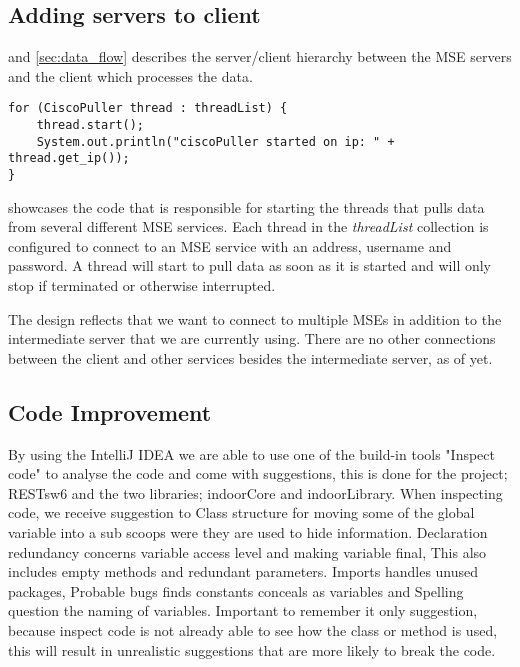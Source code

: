 \subsection*{Adding servers to client}
 and \cref{sec:data_flow} describes the server/client hierarchy between the MSE servers and the client which processes the data. 
\begin{lstlisting}[caption={Starting multiple threads to pull data from multiple MSE servers}, label={lst:cisco_puller}, language=inc_Java]
for (CiscoPuller thread : threadList) {
    thread.start();
    System.out.println("ciscoPuller started on ip: " + thread.get_ip());
}
\end{lstlisting}
 showcases the code that is responsible for starting the threads that pulls data from several different MSE services. Each thread in the \textit{threadList} collection is configured to connect to an MSE service with an address, username and password. A thread will start to pull data as soon as it is started and will only stop if terminated or otherwise interrupted.

The design reflects that we want to connect to multiple MSEs in addition to the intermediate server that we are currently using. There are no other connections between the client and other services besides the intermediate server, as of yet.

\subsection*{Code Improvement}
By using the IntelliJ IDEA we are able to use one of the build-in tools "Inspect code" to analyse the code and come with suggestions, this is done for the project; RESTsw6 and the two libraries; indoorCore and indoorLibrary. When inspecting code, we receive suggestion to Class structure for moving some of the global variable into a sub scoops were they are used to hide information. Declaration redundancy concerns variable access level and making variable final, This also includes empty methods and redundant parameters. Imports handles unused packages, Probable bugs finds constants conceals as variables and Spelling question the naming of variables. Important to remember it only suggestion, because inspect code is not already able to see how the class or method is used, this will result in unrealistic suggestions that are more likely to break the code.

